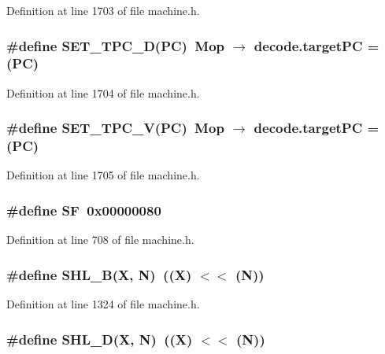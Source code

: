 Definition at line 1703 of file machine.h.
\subsubsection[{SET\_\-TPC\_\-D}]{\setlength{\rightskip}{0pt plus 5cm}\#define SET\_\-TPC\_\-D(PC)~Mop $\rightarrow$ decode.targetPC = (PC)}\label{machine_8h_8fae07831c62c46a01a9e17d05035282}




Definition at line 1704 of file machine.h.
\subsubsection[{SET\_\-TPC\_\-V}]{\setlength{\rightskip}{0pt plus 5cm}\#define SET\_\-TPC\_\-V(PC)~Mop $\rightarrow$ decode.targetPC = (PC)}\label{machine_8h_905eaae44b309e1dc6ba3ebe5a84cacb}




Definition at line 1705 of file machine.h.
\subsubsection[{SF}]{\setlength{\rightskip}{0pt plus 5cm}\#define SF~0x00000080}\label{machine_8h_1022bf161d0791b616eb885b56a04934}




Definition at line 708 of file machine.h.
\subsubsection[{SHL\_\-B}]{\setlength{\rightskip}{0pt plus 5cm}\#define SHL\_\-B(X, \/  N)~((X) $<$$<$ (N))}\label{machine_8h_1f57ddc43d3f84202aca5cd92a62f7ce}




Definition at line 1324 of file machine.h.
\subsubsection[{SHL\_\-D}]{\setlength{\rightskip}{0pt plus 5cm}\#define SHL\_\-D(X, \/  N)~((X) $<$$<$ (N))}\label{machine_8h_aa4c1eab3c768e70b1ca983a760b929c}




